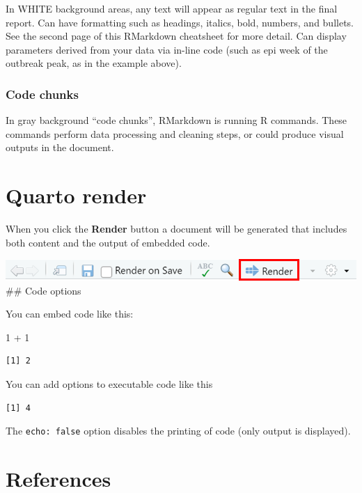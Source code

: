 \documentclass[
  letterpaper,
  DIV=11,
  numbers=noendperiod,
  oneside]{scrreprt}
\newenvironment{Shaded}{\begin{snugshade}}{\end{snugshade}}
\newcommand{\DecValTok}[1]{\textcolor[rgb]{0.68,0.00,0.00}{#1}}
\newcommand{\SpecialCharTok}[1]{\textcolor[rgb]{0.37,0.37,0.37}{#1}}
\begin{document}
In WHITE background areas, any text will appear as regular text in the
final report. Can have formatting such as headings, italics, bold,
numbers, and bullets. See the second page of this RMarkdown cheatsheet
for more detail. Can display parameters derived from your data via
in-line code (such as epi week of the outbreak peak, as in the example
above).

\hypertarget{code-chunks}{%
\subsubsection{Code chunks}\label{code-chunks}}

In gray background ``code chunks'', RMarkdown is running R commands.
These commands perform data processing and cleaning steps, or could
produce visual outputs in the document.

\hypertarget{quarto-render}{%
\section{Quarto render}\label{quarto-render}}

When you click the \textbf{Render} button a document will be generated
that includes both content and the output of embedded code.

\includegraphics{./images/paste-A8386DC4.png} \#\# Code options

You can embed code like this:

\begin{Shaded}
\begin{Highlighting}[]
\DecValTok{1} \SpecialCharTok{+} \DecValTok{1}
\end{Highlighting}
\end{Shaded}

\begin{verbatim}
[1] 2
\end{verbatim}

You can add options to executable code like this

\begin{verbatim}
[1] 4
\end{verbatim}

The \texttt{echo:\ false} option disables the printing of code (only
output is displayed).

\hypertarget{references-1}{%
\section{References}\label{references-1}}
\end{document}
